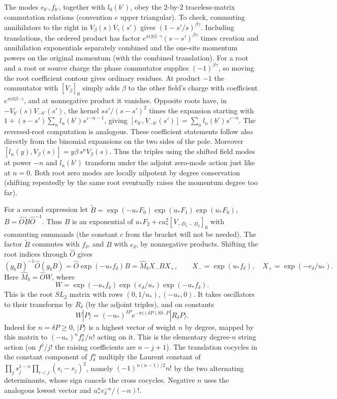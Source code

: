 \documentclass[11pt]{article}
\numberwithin{equation}{section}
\theoremstyle{definition}\newtheorem{definition}[theorem]{Definition}
\theoremstyle{remark}\newtheorem{remark}[theorem]{Remark}
\begin{document}
The modes \(e_{b'},f_{b'}\), together with \(l_0(b')\), obey the \(2\)-by-\(2\) traceless-matrix commutation relations (convention \(e\) upper triangular). To check, commuting annihilators to the right in \(V_\beta(s)V_\gamma(s')\) gives \((1-s'/s)^{\beta\gamma}\). Including translations, the ordered product has factor \(e^{\pi i S\beta\cdot\gamma}(s-s')^{\beta\gamma}\) times creation and annihilation exponentials separately combined and the one-site momentum powers on the original momentum (with the combined translation). For a root and a root or source charge the phase commutator supplies \((-1)^{\beta\gamma}\), so moving the root coefficient contour gives ordinary residues. At product \(-1\) the commutator with \([V_\beta]_0\) simply adds \(\beta\) to the other field's charge with coefficient \(e^{\pi i S\beta\cdot\gamma}\), and at nonnegative product it vanishes. Opposite roots have, in \(-V_{b'}(s)V_{-b'}(s')\), the kernel \(s s'/(s-s')^2\) times the expansion starting with
\(1+(s-s')\sum_n l_n(b')s'^{-n-1}\), giving \([e_{b'},V_{-b'}(s')]=\sum_n l_n(b')s'^{-n}\). The reversed-root computation is analogous. These coefficient statements follow also directly from the binomial expansions on the two sides of the pole. Moreover \([l_n(y),V_\beta(s)]=y\beta\,s^n V_\beta(s)\). Thus the triples using the shifted field modes at power \(-n\) and \(l_n(b')\) transform under the adjoint zero-mode action just like at \(n=0\). Both root zero modes are locally nilpotent by degree conservation (shifting repeatedly by the same root eventually raises the momentum degree too far).

For a second expression let \(\widetilde B=\exp(-u_*F_0)\exp(u_*F_1)\exp(u_*F_0)\), \(B=\widehat O\widetilde B\widehat O^{-1}\). Thus \(B\) is an exponential of \(u_* F_2+c u_*^2[V_{-D_1-D_2}]_0\) with commuting summands (the constant \(c\) from the bracket will not be needed). The factor \(\widetilde B\) commutes with \(f_\delta\), and \(B\) with \(e_\delta\), by nonnegative products. Shifting the root indices through \(\widehat O\) gives
\[
 (g_b B)^{-1}\widehat O(g_b B)=\widehat O\exp(-u_* f_\delta)B
   =\widehat M_b X_- B X_+,\qquad X_-=\exp(u_* f_\delta),\quad X_+=\exp(-e_\delta/u_*).
\]
Here \(\widehat M_b=\widehat O W\), where
\[W=\exp(-u_* f_\delta)\exp(e_\delta/u_*)\exp(-u_* f_\delta).\]
This is the root \(SL_2\) matrix with rows \((0,1/u_*),(-u_*,0)\). It takes oscillators to their transforms by \(R_\delta\) (by the adjoint triples), and on constants
\[
 W|P\rangle=(-u_*)^{\delta P}e^{-\pi i(\delta P)S\delta\cdot P}|R_\delta P\rangle .
\]
Indeed for \(n=\delta P\ge0\), \(|P\rangle\) is a highest vector of weight \(n\) by degree, mapped by this matrix to \((-u_*)^n f_\delta^n/n!\) acting on it. This is the elementary degree-\(n\) string action (on \(f^j/j!\) the raising coefficients are \(n-j+1\)). The translation cocycles in the constant component of \(f_\delta^n\) multiply the Laurent constant of \(\prod_j s_j^{1-n}\prod_{i<j}(s_i-s_j)^2\), namely \((-1)^{n(n-1)/2} n!\) by the two alternating determinants, whose sign cancels the cross cocycles. Negative \(n\) uses the analogous lowest vector and \(u_*^n e_\delta^{-n}/(-n)!\).
\end{document}
